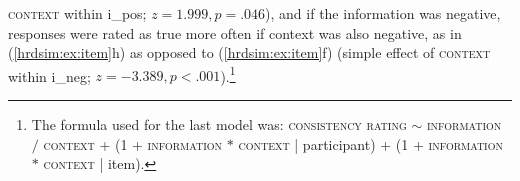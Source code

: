 \documentclass[output=paper,colorlinks,citecolor=brown]{langscibook}
\begin{document}
\textsc{context} within \textsf{i\_pos}; $z=1.999,p=.046$), and if the information was negative, responses were rated as true more often if context was also negative, as in (\ref{hrdsim:ex:item}h) as opposed to (\ref{hrdsim:ex:item}f) (simple effect of \textsc{context} within \textsf{i\_neg}; $z=-3.389,p<.001$).\footnote{The formula used for the last model was: \textsc{consistency rating} $\sim$ \textsc{information} $/$ \textsc{context} + (1 + \textsc{information} $*$ \textsc{context} | participant) + (1 + \textsc{information} $*$ \textsc{context} | item).
}




\end{document}
